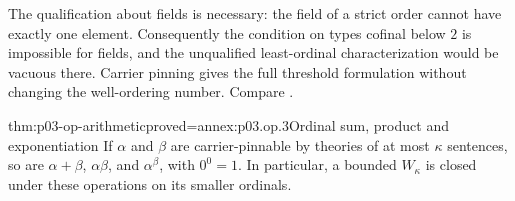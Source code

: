The qualification about fields is necessary: the field of a strict
order cannot have exactly one element. Consequently the condition
on types cofinal below \(2\) is impossible for fields, and the
unqualified least-ordinal characterization would be vacuous there.
Carrier pinning gives the full threshold formulation without
changing the well-ordering number. Compare
\cite[Ch.~II, Proposition~5.2.2, pp.~61--62]{Ebbinghaus1985ExtendedLogics}.

\begin{hbtheorem}{thm:p03-op-arithmetic}{proved=annex:p03.op.3}{Ordinal sum, product and exponentiation}
If \(\alpha\) and \(\beta\) are carrier-pinnable by theories of
at most \(\kappa\) sentences, so are
\(\alpha+\beta\), \(\alpha\beta\), and \(\alpha^\beta\),
with \(0^0=1\). In particular, a bounded \(W_\kappa\) is
closed under these operations on its smaller ordinals.
\end{hbtheorem}
